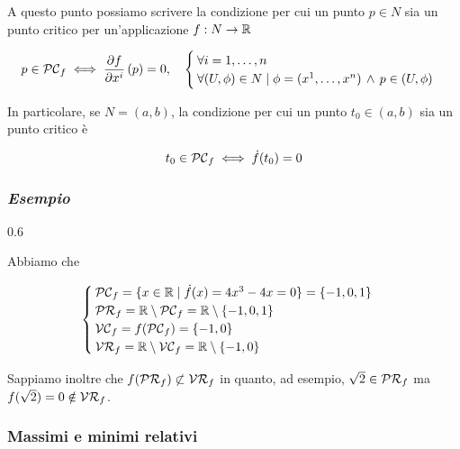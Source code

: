 A questo punto possiamo scrivere la condizione per cui un punto $ p \in N $ sia un punto critico per un'applicazione $ f : N \to \mathbb{R} $

\begin{equation}
	p \in \PC_{f} %
	\iff %
	\dpdv{f}{x^{i}} \, (p) = 0 \qcomma %
	\begin{cases}
		\forall i=1,\dots,n\\
		\forall (U,\phi) \in N \mid \phi = (x^{1},\dots,x^{n}) \, \wedge \, p \in (U,\phi)
	\end{cases}
\end{equation}

In particolare, se $ N = (a,b) $, la condizione per cui un punto $ t_{0} \in (a,b) $ sia un punto critico è

\begin{equation}
	t_{0} \in \mathcal{PC}_{f} \iff \dot{f}(t_{0}) = 0
\end{equation}

\subsubsection{\textit{Esempio}}

	{0.6}{%
			}

Abbiamo che

\begin{equation}
	\begin{cases}
		\mathcal{PC}_{f} = \{ x \in \mathbb{R} \mid \dot{f}(x) = 4 x^{3} - 4 x = 0 \} = \{ -1, 0, 1 \}\\
		\mathcal{PR}_{f} = \mathbb{R} \setminus \mathcal{PC}_{f} = \mathbb{R} \setminus \{ -1, 0, 1 \}\\
		\mathcal{VC}_{f} = f(\mathcal{PC}_{f}) = \{ -1, 0 \}\\
		\mathcal{VR}_{f} = \mathbb{R} \setminus \mathcal{VC}_{f} = \mathbb{R} \setminus \{ -1, 0 \}
	\end{cases}
\end{equation}

Sappiamo inoltre che $ f(\mathcal{PR}_{f}) \not\subset \mathcal{VR}_{f} $ in quanto, ad esempio, $ \sqrt{2} \in \mathcal{PR}_{f} $ ma $ f(\sqrt{2}) = 0 \notin \mathcal{VR}_{f} $.

\subsubsection{Massimi e minimi relativi}

